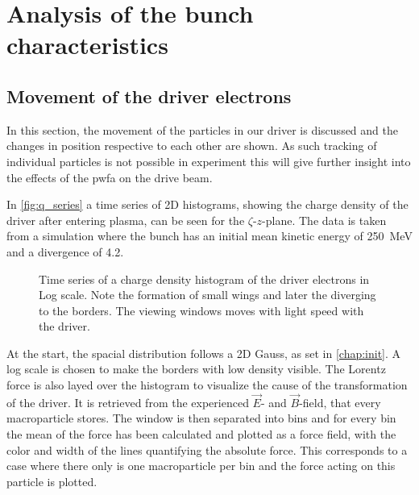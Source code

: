 \documentclass[bachelor_thesis]{subfiles}
\begin{document}
\chapter{Analysis of the bunch characteristics}
\section{Movement of the driver electrons}
In this section, the movement of the particles in our driver is discussed and the changes in position respective to each other are shown. As such tracking of individual particles is not possible in experiment
this will give further insight into the effects of the \gls{pwfa} on the drive beam.

In \autoref{fig:q_series} a time series of 2D histograms, showing the charge density of the driver after entering plasma, can be seen for the $\zeta$-$z$-plane. The data is taken from a simulation where the bunch has an initial mean kinetic energy of \qty{250}{\MeV} and a divergence of \qty{4.2}{\mrad}. 
\begin{figure}
	\centering
	\caption{Time series of a charge density histogram of the driver electrons in Log scale. Note the formation of small wings and later the diverging to the borders. The viewing windows moves with light speed with the driver.}
	\label{fig:q_series}
\end{figure}
At the start, the spacial distribution follows a 2D Gauss, as set in \autoref{chap:init}. A log scale is chosen to make the borders with low density visible. 
The Lorentz force is also layed over the histogram to visualize the cause of the transformation of the driver. It is retrieved from the experienced $\vec{E}$- and $\vec{B}$-field, that every macroparticle stores.
The window is then separated into bins and for every bin the mean of the force has been calculated and plotted as a force field, with the color and width of the lines quantifying the absolute force. 
This corresponds to a case where there only is one macroparticle per bin and the force acting on this particle is plotted.
\end{document}
